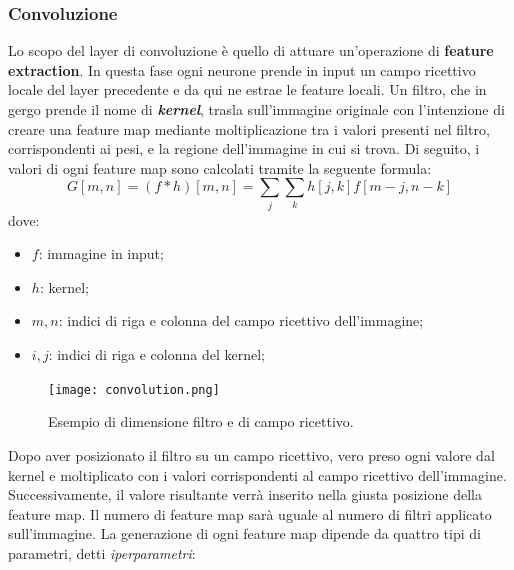 \subsubsection{Convoluzione}
Lo scopo del layer di convoluzione è quello di attuare un’operazione di {\bfseries{feature 
extraction}}. In questa fase ogni neurone prende in input un campo ricettivo 
locale del layer precedente e da qui ne estrae le feature locali. Un filtro, che in 
gergo prende il nome di {\bfseries{\emph{kernel}}}, trasla sull’immagine originale con l’intenzione di 
creare una feature map mediante moltiplicazione tra i valori presenti nel filtro, 
corrispondenti ai pesi, e la regione dell’immagine in cui si trova. Di seguito, i 
valori di ogni feature map sono calcolati tramite la seguente formula:
\begin{equation}\label{sum convolution}
    G[m,n] = (f*h)[m,n] = \sum_j\sum_kh[j,k]f[m-j,n-k]
\end{equation}
dove:
\begin{itemize}
    \item $f$: immagine in input;
    \item $h$: kernel;
    \item $m,n$: indici di riga e colonna del campo ricettivo dell'immagine;
    \item $i,j$: indici di riga e colonna del kernel;
\end{itemize}
\begin{figure}
    \centering
    \texttt{[image: convolution.png]}
    \centering
    \caption{Esempio di dimensione filtro e di campo ricettivo.}
    \label{filter dimension}
\end{figure}
Dopo aver posizionato il filtro su un campo ricettivo, vero preso ogni valore dal 
kernel e moltiplicato con i valori corrispondenti al campo ricettivo dell’immagine. 
Successivamente, il valore risultante verrà inserito nella giusta posizione della 
feature map. Il numero di feature map sarà uguale al numero di filtri applicato 
sull’immagine. La generazione di ogni feature map dipende da quattro tipi di 
parametri, detti 
\emph{iperparametri}:
